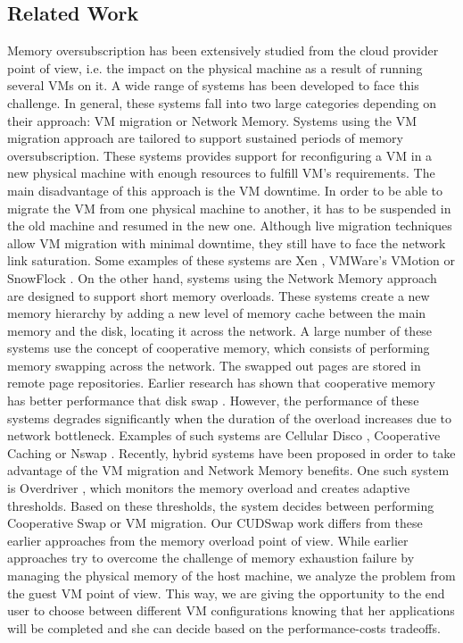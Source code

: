 \subsection{Related Work}\label{subme_related_work}
Memory oversubscription has been extensively studied from the cloud provider point of view, i.e.
the impact on the physical machine as a result of running several VMs on it. A wide range of
systems has been developed to face this challenge. In general, these systems fall into two
large categories depending on their approach: VM migration or Network Memory.
Systems using the VM migration approach are tailored to support sustained periods of
memory oversubscription. These systems provides support for reconfiguring a VM in a new
physical machine with enough resources to fulfill VM’s requirements. The main disadvantage of
this approach is the VM downtime. In order to be able to migrate the VM from one physical
machine to another, it has to be suspended in the old machine and resumed in the new one.
Although live migration techniques allow VM migration with minimal downtime, they still have
to face the network link saturation. Some examples of these systems are Xen \cite{Barham2003}, VMWare’s
VMotion \cite{Nelson2005} or SnowFlock \cite{Lagar-Cavilla2009}. On the other hand, systems using the Network Memory approach
are designed to support short memory overloads. These systems create a new memory hierarchy
by adding a new level of memory cache between the main memory and the disk, locating it across
the network. A large number of these systems use the concept of cooperative memory, which
consists of performing memory swapping across the network. The swapped out pages are stored
in remote page repositories. Earlier research has shown that cooperative memory has better
performance that disk swap \cite{Anderson1995}. However, the performance of these systems degrades significantly
when the duration of the overload increases due to network bottleneck. Examples of such
systems are Cellular Disco \cite{Govil2000}, Cooperative Caching \cite{Dahlin1994} or Nswap \cite{Newhall2003}. Recently, hybrid
systems have been proposed in order to take advantage of the VM migration and Network Memory
benefits. One such system is Overdriver \cite{Williams2011}, which monitors the memory overload and creates
adaptive thresholds. Based on these thresholds, the system decides between performing
Cooperative Swap or VM migration. Our CUDSwap work differs from these earlier approaches from
the memory overload point of view. While earlier approaches try to overcome the challenge of
memory exhaustion failure by managing the physical memory of the host machine, we analyze the
problem from the guest VM point of view. This way, we are giving the opportunity to the end
user to choose between different VM configurations knowing that her applications will be
completed and she can decide based on the performance-costs tradeoffs.

